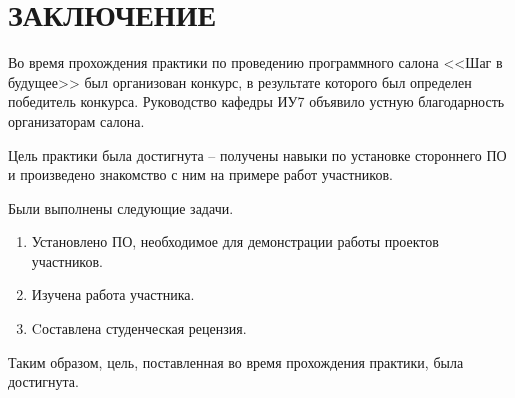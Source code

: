 \chapter*{ЗАКЛЮЧЕНИЕ}

Во время прохождения практики по проведению программного салона <<Шаг в будущее>> был организован конкурс, 
в результате которого был определен победитель конкурса. 
Руководство кафедры ИУ7 объявило устную благодарность организаторам салона.

Цель практики была достигнута -- получены навыки по установке стороннего ПО и произведено знакомство с ним на примере работ участников.

Были выполнены следующие задачи.
\begin{enumerate}
    \item Установлено ПО, необходимое для демонстрации работы проектов участников.
   \item Изучена работа участника.
   \item Cоставлена студенческая рецензия.
\end{enumerate}
Таким образом, цель, поставленная во время прохождения практики, была достигнута. 
